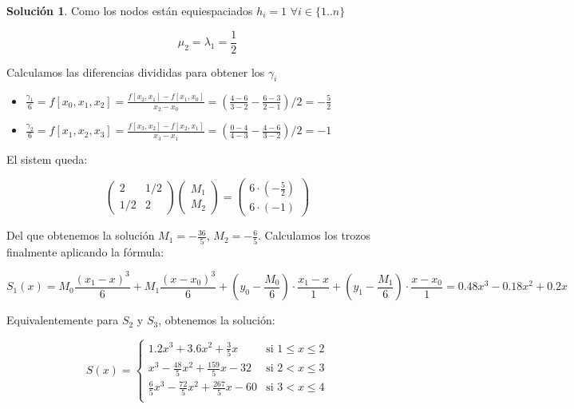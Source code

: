 \documentclass[11pt,spanish,]{article}
\theoremstyle{definition} \newtheorem*{definicion}{Definición}
\newtheorem*{solucion}{Solución}
\begin{document}
\begin{solucion}
Como los nodos están equiespaciados $h_i=1$ $\forall i \in \{1..n\}$

$$ \mu_2 = \lambda_1 =\frac{1}{2} $$

Calculamos las diferencias divididas para obtener los $\gamma_i$

\begin{itemize}

\item $\displaystyle\frac{\gamma_1}{6}=f{[x_0,x_1,x_2]}=\frac{f{[x_2,x_1]}-f{[x_1,x_0]} }{ x_2-x_0 }=\left(\frac{4-6}{3-2}-\frac{6-3}{2-1}\right)/2=-\frac{5}{2}$

\item $\displaystyle\frac{\gamma_2}{6}=f{[x_1,x_2,x_3]}=\frac{ f{[x_3,x_2]}-f{[x_2,x_1]} }{ x_3-x_1 }=\left(\frac{0-4}{4-3}-\frac{4-6}{3-2}\right)/2=-1$

\end{itemize}

El sistem queda:

\begin{equation*}
\begin{pmatrix}
    2 & 1/2 \\
    1/2 & 2 
\end{pmatrix}
\begin{pmatrix}
    M_1  \\
    M_2  
\end{pmatrix}
=
\begin{pmatrix}
    6\cdot(-\frac{5}{2})  \\
    6\cdot(-1) 
\end{pmatrix}
\end{equation*}

Del que obtenemos la solución $M_1=-\frac{36}{5}$, $M_2= -\frac{6}{5}$.
Calculamos los trozos finalmente aplicando la fórmula:

$$S_1(x)= M_0\frac{(x_1-x)^3}{6} + M_1\frac{(x-x_0)^3}{6} + (y_0-\frac{M_0}{6})\cdot\frac{x_1-x}{1} + (y_1-\frac{M_1}{6})\cdot\frac{x-x_0}{1} = 0.48x^3 - 0.18x^2 + 0.2x$$

Equivalentemente para $S_2$ y $S_3$, obtenemos la solución:

\begin{equation*}
 S(x) =
  \begin{cases}
   1.2x^3 + 3.6x^2 + \frac{3}{5}x &                                \text{si } 1 \leq x \leq 2  \\
   x^3-\frac{48}{5}x^2+\frac{159}{5}x -32   &  \text{si } 2 < x \leq 3  \\
   \frac{6}{5}x^3-\frac{72}{5}x^2+\frac{267}{5}x-60  &  \text{si } 3 < x \leq 4  \\
  \end{cases}
\end{equation*}
\end{solucion}
\end{document}
